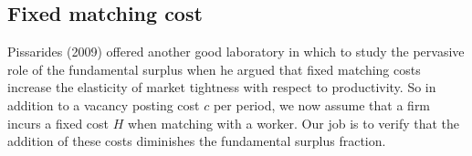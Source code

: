 

\subsection{Fixed matching cost}
Pissarides (2009) offered another good laboratory in which to study the pervasive role
of the fundamental surplus  when he argued that fixed
matching costs increase the elasticity of market
tightness with respect to productivity. So in addition to a vacancy posting cost $c$ per period,
we now assume that a firm incurs a fixed cost $H$ when matching
with a worker. Our job is  to verify that the addition of these 
 costs diminishes the fundamental surplus fraction.


